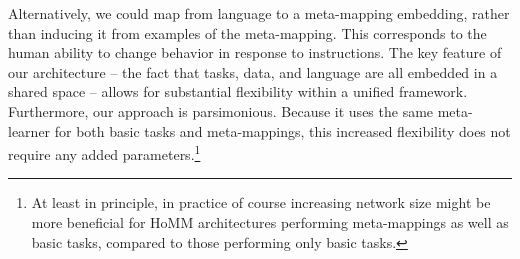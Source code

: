 \documentclass{article}
\begin{document}
Alternatively, we could map from language to a meta-mapping embedding, rather than inducing it from examples of the meta-mapping. This corresponds to the human ability to change behavior in response to instructions. The key feature of our architecture -- the fact that tasks, data, and language are all embedded in a shared space -- allows for substantial flexibility within a unified framework. Furthermore, our approach is parsimonious. Because it uses the same meta-learner for both basic tasks and meta-mappings, this increased flexibility does not require any added parameters.\footnote{At least in principle, in practice of course increasing network size might be more beneficial for HoMM architectures performing meta-mappings as well as basic tasks, compared to those performing only basic tasks.}  

%
\end{document}

